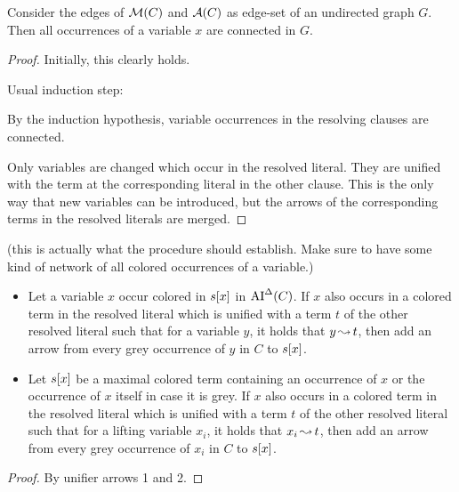 \documentclass[,%
	paper=a4,%
	DIV9, %
	twoside=false,%
	liststotoc,
	bibtotoc,
	draft=false,%
	numbers=noendperiod
]{scrartcl}
\begin{document}
\begin{prop}
	\label{prop:colored_variables_connected}
	Consider the edges of $\operatorname{\mathcal{M}}(C)$ and $\operatorname{\mathcal{A}}(C)$ as edge-set of an undirected graph $G$.
	Then all occurrences of a variable $x$ are connected in $G$.
\end{prop}
\begin{proof}
	Initially, this clearly holds.

	Usual induction step:

	By the induction hypothesis, variable occurrences in the resolving clauses are connected.

	Only variables are changed which occur in the resolved literal.
	They are unified with the term at the corresponding literal in the other clause.
	This is the only way that new variables can be introduced, but the arrows of the corresponding terms in the resolved literals are merged.
\end{proof}

\begin{lemma}(this is actually what the procedure should establish. Make sure to have some kind of network of all colored occurrences of a variable.)\nopagebreak 
	\label{lemma:colored_merge_ai_de}


	\begin{itemize}
		\item
			Let a variable $x$ occur colored in $s[x]$ in $\operatorname{AI}^\Delta(C)$.
			If $x$ also occurs in a colored term in the resolved literal which is unified with a term $t$ of the other resolved literal such that for a variable $y$, it holds that $y\operatorname{\leadsto} t$, then add an arrow from every grey occurrence of $y$ in $C$ to $s[x]$.
		\item 

			Let $s[x]$ be a maximal colored term containing an occurrence of $x$ or the occurrence of $x$ itself in case it is grey.
			If $x$ also occurs in a colored term in the resolved literal which is unified with a term $t$ of the other resolved literal 
			such that for a lifting variable $x_i$, it holds that $x_i \operatorname{\leadsto} t$, then add an arrow from every grey occurrence of $x_i$ in $C$ to $s[x]$.
	\end{itemize}


\end{lemma}
\begin{proof}
	By unifier arrows 1 and 2.
\end{proof}
\end{document}
